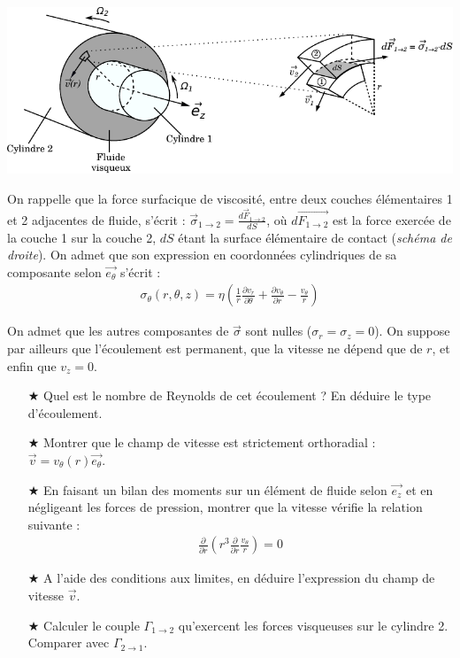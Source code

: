 \documentclass{report}
\begin{document}
\begin{center}
	\includegraphics[scale=0.8]{boite_auto.pdf}
\end{center}

On rappelle que la force surfacique de viscosité, entre deux couches élémentaires 1 et 2 adjacentes de fluide, s'écrit : $\vec{\sigma}_{1\rightarrow2}=\frac{d\vec{F}_{1\rightarrow2}}{dS}$, où $d\vec{F_{1\rightarrow2}}$ est la force exercée de la couche 1 sur la couche 2,  $dS$ étant la surface élémentaire de contact (\textit{schéma de droite}). On admet que son expression en coordonnées cylindriques de sa composante selon $\vec{e_\theta}$ s'écrit : 
\begin{align*}
	\sigma_\theta(r,\theta,z)=\eta\left(\frac{1}{r}\frac{\partial v_r}{\partial \theta}+ \frac{\partial v_\theta}{\partial r} - \frac{v_\theta}{r} \right)
\end{align*}

On admet que les autres composantes de $\vec{\sigma}$ sont nulles ($\sigma_r=\sigma_z=0$). On suppose par ailleurs que l'écoulement est permanent, que la vitesse ne dépend que de $r$, et enfin que $v_z=0$.

\begin{itemize}
		
	\item[$\bigstar$] Quel est le nombre de Reynolds de cet écoulement ? En déduire le type d'écoulement. 
	
	\item[$\bigstar$] Montrer que le champ de vitesse est strictement orthoradial : $\vec{v}=v_\theta (r)\vec{e_\theta}$.
	
	\item[$\bigstar$] En faisant un bilan des moments sur un élément de fluide selon $\vec{e_z}$ et en négligeant les forces de pression, montrer que la vitesse vérifie la relation suivante : 
	\begin{align*}
		\frac{\partial}{\partial r}\left(r^3 \frac{\partial}{\partial r}\frac{v_\theta}{r} \right) =0
	\end{align*}
	
	\item[$\bigstar$] A l'aide des conditions aux limites, en déduire l'expression du champ de vitesse $\vec{v}$.
	
	\item[$\bigstar$] Calculer le couple $\Gamma_{1\rightarrow2}$ qu'exercent les forces visqueuses sur le cylindre 2. Comparer avec $\Gamma_{2\rightarrow1}$.
	\end{itemize}
\end{document}
